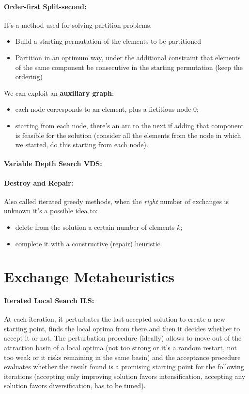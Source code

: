 \documentclass{article}
\begin{document}
	\paragraph{Order-first Split-second:} It's a method used for solving partition problems:
	\begin{itemize}
		\item Build a starting permutation of the elements to be partitioned
		\item Partition in an optimum way, under the additional constraint that elements of the same component be consecutive in the starting permutation (keep the ordering)
	\end{itemize}
	We can exploit an \textbf{auxiliary graph}: 
	\begin{itemize}
		\item each node corresponds to an element, plus a fictitious node $0$;
		\item starting from each node, there's an arc to the next if adding that component is feasible for the solution (consider all the elements from the node in which we started, do this starting from each node).\\
	\end{itemize}
	
	\paragraph{Variable Depth Search VDS:}
	
	\paragraph{Destroy and Repair:} Also called iterated greedy methods, when the \textit{right} number of exchanges is unknown it's a possible idea to:
	\begin{itemize}
		\item delete from the solution a certain number of elements $k$;
		\item complete it with a constructive (repair) heuristic.\\
	\end{itemize}
	
	\section*{Exchange Metaheuristics}
	
	\paragraph{Iterated Local Search ILS:} At each iteration, it perturbates the last accepted solution to create a new starting point, finds the local optima from there and then it decides whether to accept it or not. The perturbation procedure (ideally) allows to move out of the attraction basin of a local optima (not too strong or it's a random restart, not too weak or it risks remaining in the same basin) and the acceptance procedure evaluates whether the result found is a promising starting point for the following iterations (accepting only improving solution favors intensification, accepting any solution favors diversification, has to be tuned). \\
	
\end{document}
